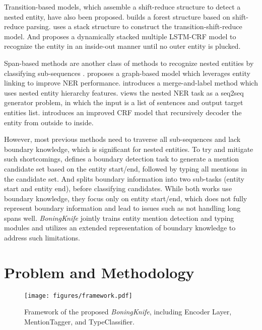 \documentclass[11pt,a4paper]{article}
\begin{document}
Transition-based models, which assemble a shift-reduce structure to detect a nested entity, have also been proposed. \citet{wang2018transition} builds a forest structure based on shift-reduce parsing.
\citet{marinho2019hierarchical} uses a stack structure to construct the transition-shift-reduce model. And 
\citet{ju2018neural} proposes a dynamically stacked multiple LSTM-CRF model to recognize the entity in an inside-out manner until no outer entity is plucked.


Span-based methods are another class of methods to recognize nested entities by classifying sub-sequences \cite{xia2019multi}. \citet{luan2019general} proposes a graph-based model which leverages entity linking to improve NER performance. \citet{fisher2019merge} introduces a merge-and-label method which uses nested entity hierarchy features.
\citet{strakov2019neural} views the nested NER task as a seq2seq generator problem, in which the input is a list of sentences and output target entities list.
\citet{shibuya2019nested} introduces an improved CRF model that recursively decoder the entity from outside to inside.

However, most previous methods need to traverse all sub-sequences and lack boundary knowledge, which is significant for nested entities. To try and mitigate such shortcomings, 
\citet{zheng2019boundary} defines a boundary detection task to generate a mention candidate set based on the entity start/end, followed by typing all mentions in the candidate set. And \citet{tan2020boundary} splits boundary information into two sub-tasks (entity start and entity end), before classifying candidates.
While both works use boundary knowledge, they focus only on entity start/end, which does not fully represent boundary information and lead to issues such as not handling long spans well. 
\textit{BoningKnife} jointly trains entity mention detection and typing modules and utilizes an extended representation of boundary knowledge to address such limitations.
 
\section{Problem and Methodology}
\label{sec:Model}

\begin{figure*}[htb!]
    \begin{center}
    \texttt{[image: figures/framework.pdf]}
    \caption{Framework of the proposed \textit{BoningKnife}, including Encoder Layer, MentionTagger, and TypeClassifier.}
    \label{fig:framework}
    \end{center}
\end{figure*}
\end{document}
